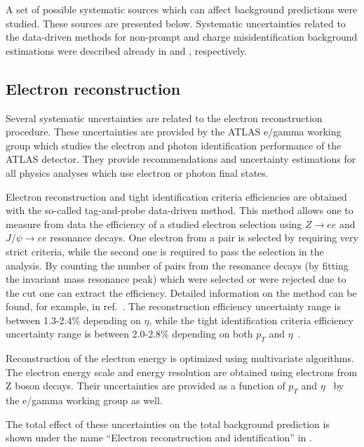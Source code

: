 A set of possible systematic sources which can affect background predictions were studied.
These sources are presented below.
Systematic uncertainties related to the data-driven methods for non-prompt and charge misidentification background estimations
were described already in  and , respectively.

\subsection{Electron reconstruction}
\label{subsec:elec_reco_system}
Several systematic uncertainties are related to the electron reconstruction procedure.
These uncertainties are provided by the ATLAS e/gamma working group which studies the electron and photon identification performance of the ATLAS detector.
They provide recommendations and uncertainty estimations for all physics analyses which use electron or photon final states.

Electron reconstruction and tight identification criteria efficiencies are obtained with the so-called tag-and-probe data-driven method.
This method allows one to measure from data the efficiency of a studied electron selection using $Z \to e e$ and $J/\psi \to e e$ resonance decays. 
One electron from a pair is selected by requiring very strict criteria, 
while the second one is required to pass the selection in the analysis.
By counting the number of pairs from the resonance decays (by fitting the invariant mass resonance peak) which were selected or 
were rejected due to the cut one can extract the efficiency. 
Detailed information on the method can be found, for example, in ref.~\cite{tag-and-probe}.
The reconstruction efficiency uncertainty range is between 1.3-2.4\% depending on $\eta$, while the 
tight identification criteria efficiency uncertainty range is between 2.0-2.8\% depending on both $p_T$ and $\eta$~\cite{electron_reco_id_2011}.

Reconstruction of the electron energy is optimized using multivariate algorithms.
The electron energy scale and energy resolution are obtained using electrons from Z boson decays.
Their uncertainties are provided as a function of $p_T$ and $\eta$~\cite{electron_energy_errors_Run1} 
by the e/gamma working group as well.

The total effect of these uncertainties on the total background prediction 
is shown under the name ``Electron reconstruction and identification'' in .

